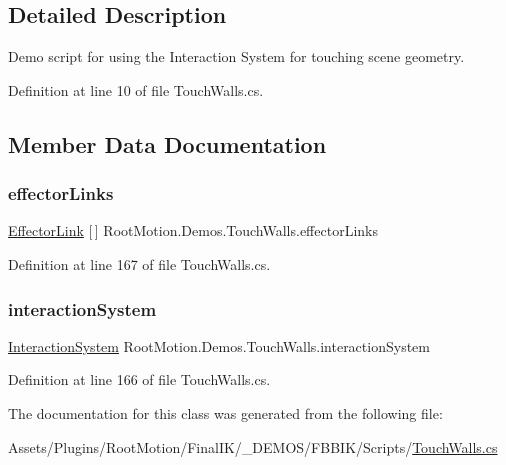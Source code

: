 \subsection{Detailed Description}
Demo script for using the Interaction System for touching scene geometry. 



Definition at line 10 of file Touch\+Walls.\+cs.



\subsection{Member Data Documentation}
\mbox{\label{class_root_motion_1_1_demos_1_1_touch_walls_ae414bb619fd658b550e565c17e59e68f}} 
\subsubsection{\texorpdfstring{effector\+Links}{effectorLinks}}
{\footnotesize\ttfamily \mbox{\hyperlink{class_root_motion_1_1_demos_1_1_touch_walls_1_1_effector_link}{Effector\+Link}} \mbox{[}$\,$\mbox{]} Root\+Motion.\+Demos.\+Touch\+Walls.\+effector\+Links}



Definition at line 167 of file Touch\+Walls.\+cs.

\mbox{\label{class_root_motion_1_1_demos_1_1_touch_walls_aaf86751db277b9b271d627f6a1229281}} 
\subsubsection{\texorpdfstring{interaction\+System}{interactionSystem}}
{\footnotesize\ttfamily \mbox{\hyperlink{class_root_motion_1_1_final_i_k_1_1_interaction_system}{Interaction\+System}} Root\+Motion.\+Demos.\+Touch\+Walls.\+interaction\+System}



Definition at line 166 of file Touch\+Walls.\+cs.



The documentation for this class was generated from the following file\+:\begin{DoxyCompactItemize}
\item 
Assets/\+Plugins/\+Root\+Motion/\+Final\+I\+K/\+\_\+\+D\+E\+M\+O\+S/\+F\+B\+B\+I\+K/\+Scripts/\mbox{\hyperlink{_touch_walls_8cs}{Touch\+Walls.\+cs}}\end{DoxyCompactItemize}
